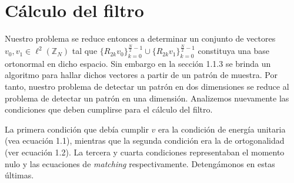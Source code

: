 \section{C\'alculo del filtro}

\par Nuestro problema se reduce entonces a determinar un conjunto de vectores $v_0,v_1\in\ell^2(\mathbb{Z}_N)$ tal que $\{R_{2k}v_0\}_{k=0}^{\frac{N}{2}-1}\cup\{R_{2k}v_1\}_{k=0}^{\frac{N}{2}-1}$ constituya una base ortonormal en dicho espacio. Sin embargo en la secci\'on 1.1.3 se brinda un algoritmo para hallar dichos vectores a partir de un patr\'on de muestra. Por tanto, nuestro problema de detectar un patr\'on en dos dimensiones se reduce al problema de detectar un patr\'on en una dimensi\'on. Analizemos nuevamente las condiciones que deben cumplirse para el c\'alculo del filtro.\\

\par La primera condici\'on que deb\'ia cumplir $v$ era la condici\'on de energ\'ia unitaria (vea ecuaci\'on 1.1), mientras que la segunda condici\'on era la de ortogonalidad (ver ecuaci\'on 1.2). La tercera y cuarta condiciones representaban el momento nulo y las ecuaciones de \textit{matching} respectivamente. Deteng\'amonos en estas \'ultimas.

